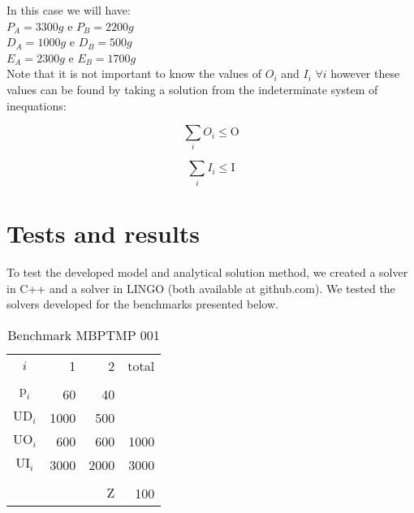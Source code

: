 \documentclass[preprint,12pt,authoryear]{elsarticle}
\begin{document}
In this case we will have: \\

$P_A = 3300g$ e $P_B=2200g$ \\

$D_A = 1000g$ e $D_B = 500g$ \\

$E_A = 2300g$ e $E_B = 1700g$ \\

Note that it is not important to know the values of $O_i$ and $I_i$ $\forall i$ however these values can be found by taking a solution from the indeterminate system of inequations:

\begin{equation}
\sum_i{O_i} \leq \textrm{O}
\end{equation}

\begin{equation}
\sum_i{I_i} \leq \textrm{I}
\end{equation}

\section{Tests and results}
\label{sec:results}

To test the developed model and analytical solution method, we created a solver in C++ and a solver in LINGO (both available at github.com). We tested the solvers developed for the benchmarks presented below. 

\begin{table}[h]
\begin{center}
\begin{tabular}[c]{c r r r}
$i$ & 1 & 2 & total \\
\cline {1-4} \\
$\textrm{p}_i$ & 60 & 40 & \\
$\textrm{UD}_i$ & 1000 & 500 & \\
$\textrm{UO}_i$ & 600 & 600 & 1000 \\
$\textrm{UI}_i$ & 3000 & 2000 & 3000 \\
\cline {1-4} \\
& & $\textrm{Z}$ & 100 \\
\end{tabular}
\label{tab:MBPTMP 001}
\caption{Benchmark MBPTMP 001}
\end{center}
\end{table}
\end{document}
